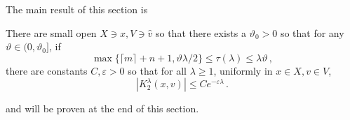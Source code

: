 \documentclass[
	fontsize=11pt, 
	twoside=false, 
	abstract=true, 
	a4paper,
]{scrartcl}
\newcommand{\eps}{\varepsilon}
\newcommand{\RR}{\mathbb{R}}
\newcommand{\Ss}{\mathscr{S}}
\newcommand{\dd}{\mathrm{d}}
\newcommand{\abs}[1]{\left\lvert#1\right\rvert}
\begin{document}
The main result of this section is
\begin{proposition}\label{prop:K2decay}
	There are small open $X \ni \hat x, V\ni \hat v$ so that there exists a $\vartheta_0 > 0$ so that for any $\vartheta \in (0,\vartheta_0]$, if %
	\begin{equation}\label{eq:tauK2}
		\max\{\lceil m\rceil+n+1,\vartheta\lambda/2\} \leq \tau(\lambda) \leq \lambda\vartheta\,,
	\end{equation}
	there are constants $C,\eps>0$ so that for all $\lambda \geq 1$, uniformly in $x\in X, v \in V$, 
	\[
		\abs{K_2^\lambda(x,v)} \leq Ce^{-\eps\lambda}\,.
	\]
\end{proposition}
and will be proven at the end of this section.

%
\end{document}
